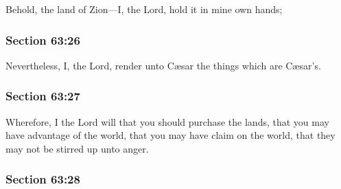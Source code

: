 		Behold, the land of Zion---I, the Lord, hold it in mine own hands;


	\subsubsection{Section 63:26} %
		\label{DC63-26}

		Nevertheless, I, the Lord, render unto Cæsar the things which are Cæsar's.


	\subsubsection{Section 63:27} %
		\label{DC63-27}

		Wherefore, I the Lord will that you should purchase the lands, that you may have advantage of the world, that you may have claim on the world, that they may not be stirred up unto anger.


	\subsubsection{Section 63:28} %
		\label{DC63-28}

